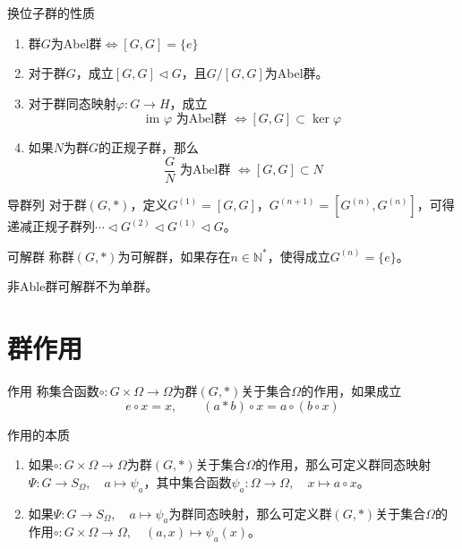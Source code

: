 \documentclass[lang = cn, scheme = chinese, thmcnt = section]{elegantbook}
\begin{document}
\begin{proposition}{换位子群的性质}
	\begin{enumerate}
		\item 群$G$为Abel群$\iff [G,G]=\{e\}$
		\item 对于群$G$，成立$[G,G]\triangleleft G$，且$G/[G,G]$为Abel群。
		\item 对于群同态映射$\varphi:G\to H$​，成立
		$$
		\text{im }\varphi \text{ 为Abel群 }\iff [G,G]\subset\ker\varphi
		$$
		\item 如果$N$为群$G$​的正规子群，那么
		$$
		\frac{G}{N} \text{ 为Abel群 }\iff [G,G]\subset N
		$$
	\end{enumerate}
\end{proposition}

\begin{definition}{导群列}
	对于群$(G,*)$，定义$G^{(1)}=[G,G]$，$G^{(n+1)}=[G^{(n)},G^{(n)}]$，可得递减正规子群列$\cdots\triangleleft G^{(2)}\triangleleft G^{(1)}\triangleleft G$。
\end{definition}

\begin{definition}{可解群}
	称群$(G,*)$为可解群，如果存在$n\in\mathbb{N}^*$，使得成立$G^{(n)}=\{e\}$。
\end{definition}

\begin{proposition}
	非Able群可解群不为单群。
\end{proposition}

\section{群作用}

\begin{definition}{作用}
	称集合函数$\circ:G\times \Omega\to \Omega$为群$(G,*)$关于集合$\Omega$的作用，如果成立
	$$
	e\circ x=x,\qquad (a*b)\circ x=a\circ(b\circ x)
	$$
\end{definition}

\begin{theorem}{作用的本质}
	\begin{enumerate}
		\item 如果$\circ:G\times \Omega\to \Omega$为群$(G,*)$关于集合$\Omega$的作用，那么可定义群同态映射$\Psi:G\to S_{\Omega},\quad a\mapsto \psi_{a}$，其中集合函数$\psi_{a}:\Omega\to \Omega,\quad x\mapsto a\circ x$。
		\item 如果$\Psi:G\to S_{\Omega},\quad a\mapsto \psi_{a}$为群同态映射，那么可定义群$(G,*)$关于集合$\Omega$的作用$\circ:G\times \Omega\to \Omega,\quad (a,x)\mapsto \psi_{a}(x)$。
	\end{enumerate}
\end{theorem}
\end{document}
